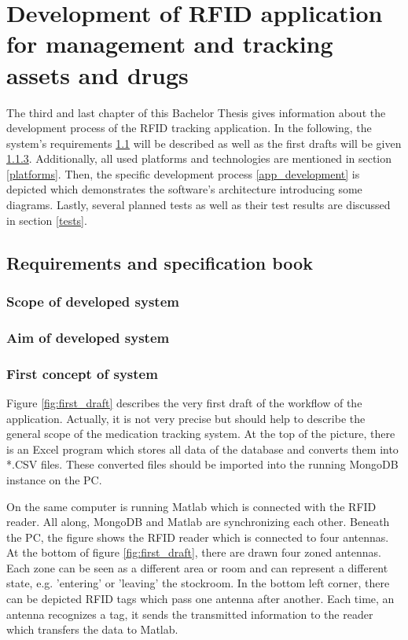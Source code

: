 \chapter{Development of RFID application for management and tracking assets and drugs}
\label{Kap3}

The third and last chapter of this Bachelor Thesis gives information about the development process of the RFID tracking application. In the following, the system's requirements \ref{requirements} will be described as well as the first drafts will be given \ref{firstconcept}. Additionally, all used platforms and technologies are mentioned in section \ref{platforms}. Then, the specific development process \ref{app_development} is depicted which demonstrates the software's architecture introducing some diagrams. Lastly, several planned tests as well as their test results are discussed in section \ref{tests}.

\section{Requirements and specification book}\label{requirements}

\subsection{Scope of developed system}

\subsection{Aim of developed system}

\subsection{First concept of system} \label{firstconcept}

Figure \ref{fig:first_draft} describes the very first draft of the workflow of the application. Actually, it is not very precise but should help to describe the general scope of the medication tracking system. 
At the top of the picture, there is an Excel program which stores all data of the database and converts them into *.CSV files. These converted files should be imported into the running MongoDB instance on the PC. 

On the same computer is running Matlab which is connected with the RFID reader. All along, MongoDB and Matlab are synchronizing each other. Beneath the PC, the figure shows the RFID reader which is connected to four antennas. At the bottom of figure \ref{fig:first_draft}, there are drawn four zoned antennas. Each zone can be seen as a different area or room and can represent a different state, e.g. 'entering' or 'leaving' the stockroom. In the bottom left corner, there can be depicted RFID tags which pass one antenna after another. Each time, an antenna recognizes a tag, it sends the transmitted information to the reader which transfers the data to Matlab.  

